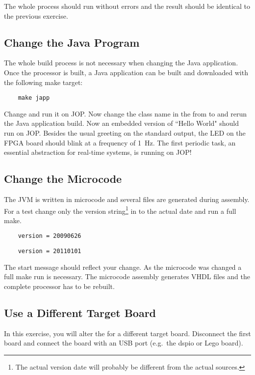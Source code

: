 The whole process should run without errors and the result should be
identical to the previous exercise.

\subsection{Change the Java Program}

The whole build process is not necessary when changing the Java
application. Once the processor is built, a Java application can be
built and downloaded with the following make target:
\begin{lstlisting}
    make japp
\end{lstlisting}
Change  and run it on JOP. Now change the class
name in the  from  to
 and rerun the Java application build. Now an embedded
version of ``Hello World" should run on JOP. Besides the usual
greeting on the standard output, the LED on the FPGA board should
blink at a frequency of 1~Hz. The first periodic task, an essential
abstraction for real-time systems, is running on JOP!

\subsection{Change the Microcode}

The JVM is written in microcode and several  files are
generated during assembly. For a test change only the version
string\footnote{The actual version date will probably be different
from the actual sources.} in  to the actual date and
run a full make.
\begin{lstlisting}
    version = 20090626
\end{lstlisting}
\begin{lstlisting}
    version = 20110101
\end{lstlisting}
The start message should reflect your change. As the microcode was
changed a full make run is necessary. The microcode assembly
generates VHDL files and the complete processor has to be rebuilt.


\subsection{Use a Different Target Board}

In this exercise, you will alter the  for a different
target board. Disconnect the first board and connect the board with
an USB port (e.g.\ the dspio or Lego board).

